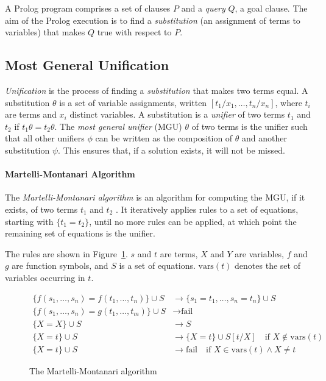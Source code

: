 A Prolog program comprises a set of clauses $P$ and a \emph{query} $Q$, a goal clause. The aim of the Prolog execution is to find a \emph{substitution} (an assignment of terms to variables) that makes $Q$ true with respect to $P$.

\subsection{Most General Unification}

\emph{Unification} is the process of finding a \emph{substitution} that makes two terms equal. A substitution $\theta$ is a set of variable assignments, written $[t_1/x_1, \ldots, t_n/x_n]$, where $t_i$ are terms and $x_i$ distinct variables. A substitution is a \emph{unifier} of two terms $t_1$ and $t_2$ if $t_1\theta = t_2\theta$. The \emph{most general unifier} (MGU) $\theta$ of two terms is the unifier such that all other unifiers $\phi$ can be written as the composition of $\theta$ and another substitution $\psi$. This ensures that, if a solution exists, it will not be missed.

\paragraph{Martelli-Montanari Algorithm}

The \emph{Martelli-Montanari algorithm} is an algorithm for computing the MGU, if it exists, of two terms $t_1$ and $t_2$ \cite{martelliEfficientUnificationAlgorithm1982}. It iteratively applies rules to a set of equations, starting with $\{t_1 = t_2\}$, until no more rules can be applied, at which point the remaining set of equations is the unifier.

The rules are shown in Figure~\ref{fig:martelli-montanari}. $s$ and $t$ are terms, $X$ and $Y$ are variables, $f$ and $g$ are function symbols, and $S$ is a set of equations. $\text{vars}(t)$ denotes the set of variables occurring in $t$.

\begin{figure}[H]
\begin{align*}
\{f(s_1, \ldots, s_n) = f(t_1, \ldots, t_n)\} \cup S &\rightarrow \{s_1 = t_1, \ldots, s_n = t_n\} \cup S \\
\{f(s_1, \ldots, s_n) = g(t_1, \ldots, t_m)\} \cup S &\rightarrow \text{fail} \\
\{X = X\} \cup S &\rightarrow S \\
\{X = t\} \cup S &\rightarrow \{X = t\} \cup S[t/X] \quad \text{if } X \notin \text{vars}(t) \\
\{X = t\} \cup S &\rightarrow \text{fail} \quad \text{if } X \in \text{vars}(t) \land X \neq t
\end{align*}
\caption{The Martelli-Montanari algorithm}
\label{fig:martelli-montanari}
\end{figure}

